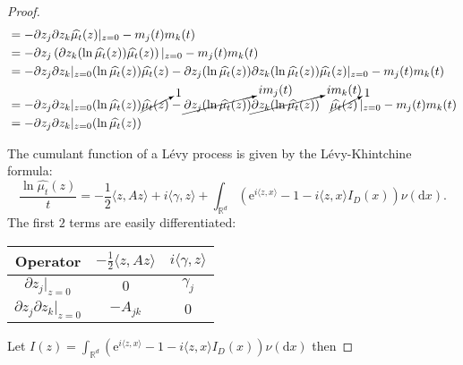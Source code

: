 \documentclass[a4paper,11pt]{article}
\begin{document}
\begin{proof}
{\begin{align}
                           & = -\partial z_{j} \partial z_{k} \widehat{\mu_{t}}(z)|_{z=0} - m_{j}(t)m_{k}(t)                                                                                                                                                                                                                                       \\
                           & = -\partial z_{j} \left( \partial z_{k} (\ln \widehat{\mu_{t}}(z)) \widehat{\mu_{t}}(z) \right) |_{z=0} - m_{j}(t)m_{k}(t)                                                                                                                                                                                            \\
                           & = -\partial z_{j} \partial z_{k}|_{z=0} (\ln \widehat{\mu_{t}}(z)) \widehat{\mu_{t}}(z)   -\partial z_{j}( \ln\widehat{\mu_{t}}(z) )\partial z_{k}( \ln\widehat{\mu_{t}}(z) )\widehat{\mu_{t}}(z)|_{z=0} - m_{j}(t)m_{k}(t)                                                                                           \\
                           & = -\partial z_{j} \partial z_{k}|_{z=0} (\ln \widehat{\mu_{t}}(z)) \cancelto{1}{\widehat{\mu_{t}}(z)}   -\cancelto{i m_{j}(t)}{\partial z_{j}( \ln\widehat{\mu_{t}}(z) )}\cancelto{im_{k}(t)}{\partial z_{k}( \ln\widehat{\mu_{t}}(z) )} \hspace{0.3cm}\cancelto{1}{\widehat{\mu_{t}}(z)}\,|_{z=0} - m_{j}(t)m_{k}(t) \\
                           & = -\partial z_{j} \partial z_{k}|_{z=0} (\ln \widehat{\mu_{t}}(z))
            \end{align}
        }

    The cumulant function of a Lévy process is given by the Lévy-Khintchine formula:
    \begin{equation}
        \frac{\ln \widehat{\mu_{t}}(z)}{t} = -\frac{1} {2} \langle z, A z \rangle +i \langle\gamma, z \rangle+\int_{\mathbb{R}^{d}} \left( \mathrm{e}^{i \langle z, x \rangle}-1-i \langle z, x \rangle I_{D} ( x ) \right) \nu(\mathrm{d} x)
        .
    \end{equation}
    The first $2$ terms are easily differentiated:
    \begin{center}
        \renewcommand{\arraystretch}{1.5} %
        \begin{tabular}{|c|c|c|}
            \hline
            Operator                               & $-\frac{1}{2} \langle z, A z \rangle$ & $i \langle\gamma, z \rangle$ \\ \hline
            $\partial z_{j}|_{z=0}$                & $0$                                   & $\gamma_{j}$                 \\ \hline
            $\partial z_{j} \partial z_{k}|_{z=0}$ & $-A_{jk}$                             & $0$                          \\ \hline
        \end{tabular}
    \end{center}
    Let $I(z)=\int_{\mathbb{R}^{d}} \left( \mathrm{e}^{i \langle z, x \rangle}-1-i \langle z, x \rangle I_{D} ( x ) \right) \nu(\mathrm{d} x)$ then


\end{proof}
\end{document}

